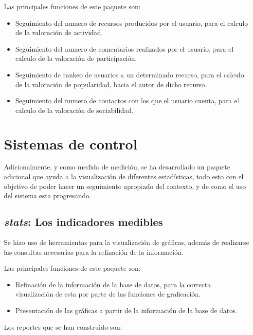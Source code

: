 Las principales funciones de este paquete son:
\begin{itemize}
\item Seguimiento del numero de recursos producidos por el usuario, para el
calculo de la valoración de actividad.
\item Seguimiento del numero de comentarios realizados por el usuario, para el
calculo de la valoración de participación.
\item Seguimiento de rankeo de usuarios a un determinado recurso, para el
calculo de la valoración de popularidad, hacia el autor de dicho recurso.
\item Seguimiento del numero de contactos con los que el usuario cuenta, para el
calculo de la valoración de sociabilidad.
\end{itemize}

\section{Sistemas de control}
Adicionalmente, y como medida de medición, se ha desarrollado un paquete
adicional que ayuda a la visualización de diferentes estadísticas, todo esto con
el objetivo de poder hacer un seguimiento apropiado del contexto, y de como el
uso del sistema esta progresando.

\subsection{\emph{stats}: Los indicadores medibles}
Se hizo uso de herramientas para la visualización de gráficas, además de
realizarse las consultas necesarias para la refinación de la información.

Las principales funciones de este paquete son:

\begin{itemize}
\item Refinación de la información de la base de datos, para la correcta
visualización de esta por parte de las funciones de graficación.
\item Presentación de las gráficas a partir de la información de la base de
datos.
\end{itemize}

Los reportes que se han construido son:

